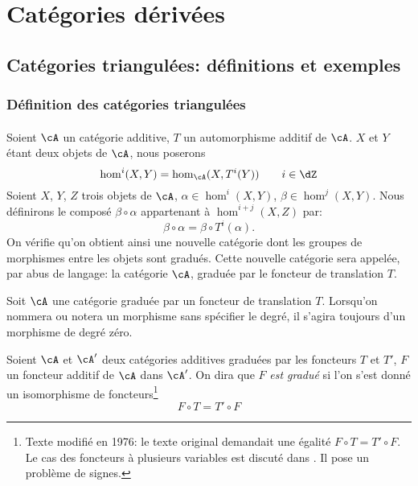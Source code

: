 
\chapter{Catégories dérivées}\label{VIII}










\section{Catégories triangulées: définitions et exemples}\label{VIII:1}





\subsection{Définition des catégories triangulées}\label{VIII:1-1}


\addtocounter{subsubsection}{-1}
\subsubsection{}\label{VIII:1-1-0}

Soient $\cA$ un catégorie additive, $T$ un automorphisme additif de $\cA$. 
$X$ et $Y$ étant deux objets de $\cA$, nous poserons 
\[
  \hom^i(X,Y) = \hom_\cA(X,T^i(Y)) \qquad i\in \dZ 
\]
Soient $X$, $Y$, $Z$ trois objets de $\cA$, $\alpha\in \hom^i(X,Y)$, 
$\beta\in \hom^j(X,Y)$. Nous définirons le composé $\beta\circ\alpha$ 
appartenant à $\hom^{i+j}(X,Z)$ par: 
\[
  \beta\circ \alpha = \beta\circ T^i(\alpha) \text{.}
\]
On vérifie qu'on obtient ainsi une nouvelle catégorie dont les groupes de 
morphismes entre les objets sont gradués. Cette nouvelle catégorie sera 
appelée, par abus de langage: la catégorie $\cA$, graduée par le foncteur 
de translation $T$. 

Soit $\cA$ une catégorie graduée par un foncteur de translation $T$. 
Lorsqu'on nommera ou notera un morphisme sans spécifier le degré, il 
s'agira toujours d'un morphisme de degré zéro. 

Soient $\cA$ et $\cA'$ deux catégories additives graduées par les foncteurs
$T$ et $T'$, $F$ un foncteur additif de $\cA$ dans $\cA'$. On dira que $F$ 
\emph{est gradué} si l'on s'est donné un isomorphisme de 
foncteurs\footnote{Texte modifié en 1976: le texte original demandait une 
égalité $F\circ T=T'\circ F$. Le cas des foncteurs à plusieurs variables 
est discuté dans \cite[XVIII 0.2]{sga4}. Il pose un problème de signes.} 
\[
  F\circ T = T'\circ F 
\]

